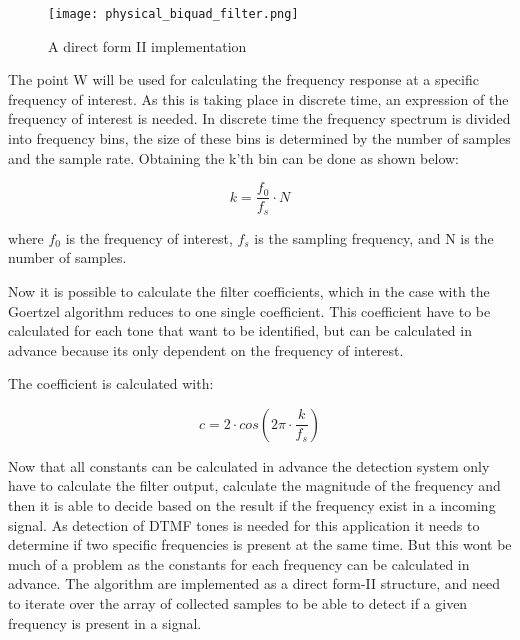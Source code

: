 	\begin{figure}[htb]
		\begin{center}
		\texttt{[image: physical\_biquad\_filter.png]}%
		\caption{A direct form II implementation}
		\label{fig:physical_biquad_filter}
		\end{center}
	\end{figure}
	
	The point W will be used for calculating the frequency response at a specific frequency of interest. As this is taking
	place in discrete time, an expression of the frequency of interest is needed. In discrete time the frequency spectrum
	is divided into frequency bins, the size of these bins is determined by the number of samples and the sample rate.
	Obtaining the k'th bin can be done as shown below:
	\begin{center}\begin{equation}k = \frac{f_{0}}{f_{s}}\cdot N\end{equation}\end{center}
	where $f_{0}$ is the frequency of interest, $f_{s}$ is the sampling frequency, and N is the number of samples.
	
	Now it is possible to calculate the filter coefficients, which in the case with the Goertzel algorithm reduces 
	to one single coefficient. This coefficient have to be calculated for each tone that want to be identified, but can 
	be calculated in advance because its only dependent on the frequency of interest.
	
	The coefficient is calculated with:
	\begin{center}\begin{equation}c = 2\cdot cos(2\pi \cdot \frac{k}{f_{s}})\end{equation}\end{center}
	
	Now that all constants can be calculated in advance the detection system only have to calculate the filter output, calculate
	the magnitude of the frequency and then it is able to decide based on the result if the frequency exist in a incoming signal.
	As detection of DTMF tones is needed for this application it needs to determine if two specific frequencies is present at the
	same time. But this wont be much of a problem as the constants for each frequency can be calculated in advance.
	The algorithm are implemented as a direct form-II structure, and need to iterate over the array of collected samples to be
	able to detect if a given frequency is present in a signal.
	
